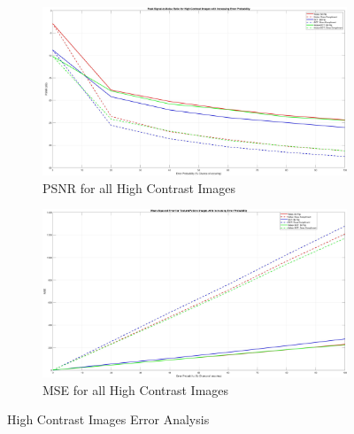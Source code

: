 \documentclass[landscape,a0paper,fontscale=0.4]{baposter} %
\begin{document}
\begin{poster}
{\vspace{-1em}
\begin{figure}[H]
\centering
	\begin{subfigure}{0.4\textwidth} %
		\includegraphics[scale=0.06]{PSNRHigh}
		\caption{PSNR for all High Contrast Images} %
	\end{subfigure}
	\vspace{1em} %
	\begin{subfigure}{0.4\textwidth} %
		\includegraphics[scale=0.06]{MSEPattern}
		\caption{MSE for all High Contrast Images} %
	\end{subfigure}
	\vspace{-2em}
	\caption{High Contrast Images Error Analysis}
	\label{fig: High Contrast Error} %
\end{figure}

	
}



\end{poster}
\end{document}
